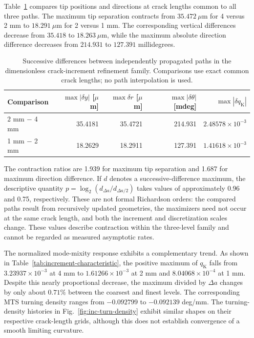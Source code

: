 \documentclass[11pt]{article}
\begin{document}
Table~\ref{tab:increment-pairwise} compares tip positions
and directions at crack lengths common to all three paths.
The maximum tip separation contracts from
$35.472~\mu\mathrm{m}$ for 4 versus 2 mm to
$18.291~\mu\mathrm{m}$ for 2 versus 1 mm.
The corresponding vertical differences decrease from
$35.418$ to $18.263~\mu\mathrm{m}$, while the
maximum absolute direction difference decreases from
$214.931$ to $127.391$ millidegrees.

\begin{table}[H]
\centering
\small
\setlength{\tabcolsep}{4.0pt}
\caption{Successive differences between independently propagated paths in
the dimensionless crack-increment refinement family. Comparisons use exact
common crack lengths; no path interpolation is used.}
\label{tab:increment-pairwise}
\begin{tabular}{lrrrr}
\toprule
Comparison &
$\max|\delta y|$ [$\mu$m] &
$\max\delta r$ [$\mu$m] &
$\max|\delta\theta|$ [mdeg] &
$\max|\delta q_{\mathrm{K}}|$\\
\midrule
2 mm $-$ 4 mm & 35.4181 & 35.4721 & 214.931 & $2.48578\times10^{-3}$\\
1 mm $-$ 2 mm & 18.2629 & 18.2911 & 127.391 & $1.41618\times10^{-3}$\\
\bottomrule
\end{tabular}
\end{table}

The contraction ratios are 1.939 for maximum tip
separation and 1.687 for maximum direction difference.
If $d$ denotes a successive-difference maximum,
the descriptive quantity
$p=\log_2(d_{\Delta a}/d_{\Delta a/2})$
takes values of approximately 0.96 and 0.75,
respectively. These are not formal Richardson orders:
the compared paths result from recursively updated
geometries, the maximizers need not occur at the same
crack length, and both the increment and discretization
scales change. These values describe contraction within the three-level family
and cannot be regarded as measured asymptotic rates.

The normalized mode-mixity response exhibits a
complementary trend. As shown in
Table~\ref{tab:increment-characteristic}, the
positive maximum of $q_{\mathrm{K}}$ falls from
$3.23937\times10^{-3}$ at 4 mm to
$1.61266\times10^{-3}$ at 2 mm and
$8.04068\times10^{-4}$ at 1 mm.
Despite this nearly proportional decrease, the
maximum divided by $\Delta a$ changes by only
about $0.71\%$ between the coarsest and finest levels.
The corresponding MTS turning density ranges from
$-0.092799$ to $-0.092139$ deg/mm.
The turning-density histories in
Fig.~\ref{fig:inc-turn-density} exhibit similar shapes
on their respective crack-length grids, although this
does not establish convergence of a smooth limiting
curvature.
\end{document}
